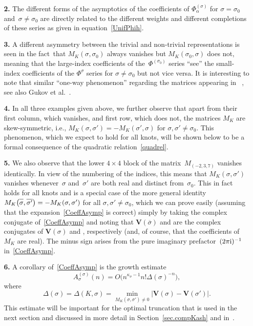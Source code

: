 \documentclass[pdftex]{sigma}
\numberwithin{equation}{section}
\def\l{\lambda}
\def\a{\alpha}
\def\l{\lambda}
\def\a{\alpha}
\def\l{\lambda}
\def\s{\sigma}
\def\W{\kappa} %
\def\V{\mathbf V}
\begin{document}
{\bf 2.}
The different forms of the asymptotics of the coefficients of $\Phi^{(\s)}_\a$
for $\s=\s_0$ and~$\s\ne\s_0$ are directly related to the different weights
and different completions of these series as given in equation~\eqref{UnifPhih}.

{\bf 3.}
A different asymmetry between the trivial and non-trivial
representations is seen in the fact~that $M_K(\s,\s_0)$ always vanishes but
$M_K(\s_0,\s)$ does not, meaning that the large-index coefficients of
the~$\Phi^{(\s_0)}$ series ``see'' the small-index coefficients of the
$\Phi^\s$ series for $\s\ne\s_0$ but not vice versa. It is interesting to note
that similar ``one-way phenomenon'' regarding the matrices appearing in
~\cite{Witten:continuation}, see also Gukov et al.~\cite{Gukov:resurgence,Gukov:BPS}.

{\bf 4.}
In all three examples given above, we further observe that apart from their
first column, which vanishes, and first row, which does not, the matrices
$M_K$ are skew-symmetric, i.e., ${M_K(\s,\s')=-M_K(\s',\s)}$ for $\s, \s'\ne\s_0$.
This phenomenon, which we expect to hold for all knots, will be shown below
to be a formal consequence of the quadratic relation~\eqref{quadrel}.

{\bf 5.}
We also observe that the lower $4\times4$ block of the matrix~$M_{(-2,3,7)}$
vanishes identically. In view of the numbering of the indices, this
means that $M_K(\s,\s')$ vanishes whenever~$\s$ and~$\s'$ are both real and distinct
from~$\s_0$. This in fact holds for all knots and is a special case of the more
general identity $M_K\big(\overline{\s\vphantom I},\overline{\s'}\big)=-M_K(\s,\s')$
for all $\s, \s'\ne\s_0$, which we can prove easily (assuming that the
expansion~\eqref{CoeffAsymp} is correct) simply by taking the complex conjugate
of~\eqref{CoeffAsymp} and noting that $\V(\overline\s)$ and \smash{$A_\a^{(\overline\s)}(n)$}
are the complex conjugates of $\V(\s)$ and \smash{$A_{-\a}^{(\s)}(n)$}, respectively (and, of
course, that the coefficients of~$M_K$ are real). The minus sign arises from the pure
imaginary prefactor~$(2\pi {\rm i})^{-1}$ in~\eqref{CoeffAsymp}.

{\bf 6.}
A corollary of~\eqref{CoeffAsymp} is the growth estimate
\[%
A_\s^{(\s)}(n)= O\bigl(n^{\W_\s-1}n! \Delta(\s)^{-n}\bigr) ,
\]
where
\[%
\Delta(\s)=\Delta(K,\s) = \min_{M_K(\s,\s')\ne0}\bigl|\V(\s)-\V(\s')\bigr| .
\]
This estimate will be important for the optimal truncation that is used in the
next section and discussed in more detail in Section~\ref{sec.compKash} and
in~\cite{GZ:optimal}.
\end{document}
